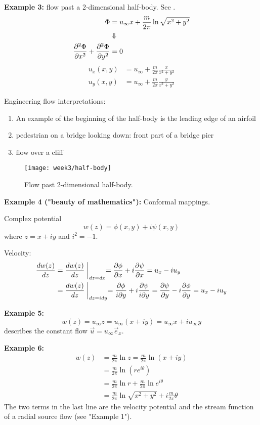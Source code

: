 \textbf{Example 3:} flow past a 2-dimensional half-body. See .
\begin{align}
\Phi &= u_\infty x + \frac{m}{2\pi}\ln\sqrt{x^2+y^2}\\
&\Downarrow\notag\\
\frac{\partial^2 \Phi}{\partial x^2}+\frac{\partial^2 \Phi}{\partial y^2} &= 0
\end{align}
\begin{align}
u_x(x,y) &= u_\infty + \frac{m}{2\pi}\frac{x}{x^2+y^2}\\
u_y(x,y) &= u_\infty + \frac{m}{2\pi}\frac{y}{x^2+y^2}
\end{align}

Engineering flow interpretations:
\begin{enumerate}
\item An example of the beginning of the half-body is the leading edge of an airfoil
\item pedestrian on a bridge looking down: front part of a bridge pier
\item flow over a cliff
\end{enumerate}

\begin{figure}[!h]
    \centering
    \texttt{[image: week3/half-body]}\\
    \caption{Flow past 2-dimensional half-body.}
    \label{fig:half-body}
\end{figure}

\textbf{Example 4 ("beauty of mathematics"):} Conformal mappings.

Complex potential
\begin{equation}
w(z) = \phi(x,y)+i\psi(x,y)
\end{equation}
where $z=x+iy$ and $i^2=-1$.

Velocity:
\begin{align}
\frac{d w(z)}{d z} &= \frac{d w(z)}{d z}\biggm\vert_{dz=dx} = \frac{\partial \phi}{\partial x}+i\frac{\partial \psi}{\partial x} = u_x-iu_y \\
&= \frac{d w(z)}{d z}\biggm\vert_{dz=idy} = \frac{\partial\phi}{i\partial y}+i\frac{\partial\psi}{i\partial y} = \frac{\partial \psi}{\partial y}-i\frac{\partial \phi}{\partial y} = u_x-iu_y
\end{align}

\textbf{Example 5:}
\begin{equation}
w(z)=u_\infty z = u_\infty(x+iy) = u_\infty x + iu_\infty y
\end{equation}
describes the constant flow $\vec{u}=u_\infty \vec{e}_x$.

\textbf{Example 6:}
\begin{align}
w(z) &= \frac{m}{2\pi}\ln z = \frac{m}{2\pi} \ln(x+iy)\\
&= \frac{m}{2\pi}\ln\left(re^{i\theta}\right)\\
&= \frac{m}{2\pi}\ln r +\frac{m}{2\pi}\ln e^{i\theta}\\
&= \frac{m}{2\pi}\ln\sqrt{x^2+y^2} + i\frac{m}{2\pi}\theta
\end{align}
The two terms in the last line are the velocity potential and the stream function of a radial source flow (see "Example 1").

